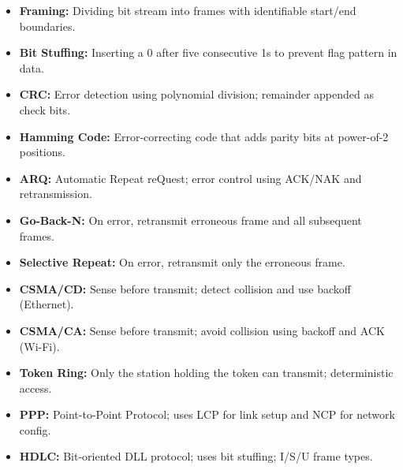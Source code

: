 \documentclass[12pt,a4paper]{article}
\begin{document}
\vspace{6pt}

\begin{tcolorbox}[defbox, title={\textbf{One-Line Definitions}}]
\begin{itemize}[leftmargin=*, itemsep=3pt, topsep=0pt]
  \item \textbf{Framing:} Dividing bit stream into frames with identifiable start/end boundaries.
  \item \textbf{Bit Stuffing:} Inserting a 0 after five consecutive 1s to prevent flag pattern in data.
  \item \textbf{CRC:} Error detection using polynomial division; remainder appended as check bits.
  \item \textbf{Hamming Code:} Error-correcting code that adds parity bits at power-of-2 positions.
  \item \textbf{ARQ:} Automatic Repeat reQuest; error control using ACK/NAK and retransmission.
  \item \textbf{Go-Back-N:} On error, retransmit erroneous frame and all subsequent frames.
  \item \textbf{Selective Repeat:} On error, retransmit only the erroneous frame.
  \item \textbf{CSMA/CD:} Sense before transmit; detect collision and use backoff (Ethernet).
  \item \textbf{CSMA/CA:} Sense before transmit; avoid collision using backoff and ACK (Wi-Fi).
  \item \textbf{Token Ring:} Only the station holding the token can transmit; deterministic access.
  \item \textbf{PPP:} Point-to-Point Protocol; uses LCP for link setup and NCP for network config.
  \item \textbf{HDLC:} Bit-oriented DLL protocol; uses bit stuffing; I/S/U frame types.
\end{itemize}
\end{tcolorbox}

\vspace{6pt}
\end{document}
